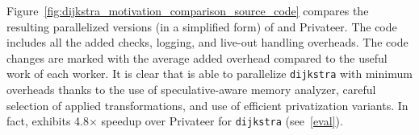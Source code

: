 


Figure~\ref{fig:dijkstra_motivation_comparison_source_code} compares the
resulting parallelized versions (in a simplified form) of \name and
Privateer. The code includes all the added checks, logging, and live-out
handling overheads. The code changes are marked with the average added
overhead compared to the useful work of each worker. It is clear that \name is
able to parallelize \texttt{dijkstra} with minimum overheads thanks to the
use of speculative-aware memory analyzer, careful selection of applied
transformations, and use of efficient privatization variants. In fact,
\name exhibits 4.8$\times$ speedup over Privateer for \texttt{dijkstra}
(see~\ref{eval}).

%
%
%
%
%
%
